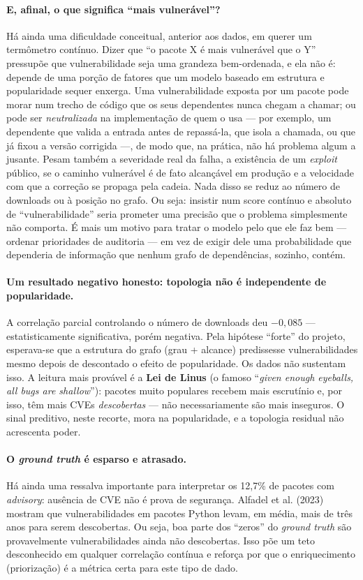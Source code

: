 \documentclass[11pt,a4paper]{article}
\begin{document}
\paragraph{E, afinal, o que significa ``mais vulnerável''?}
Há ainda uma dificuldade conceitual, anterior aos dados, em querer um termômetro
contínuo. Dizer que ``o pacote X é mais vulnerável que o Y'' pressupõe que
vulnerabilidade seja uma grandeza bem-ordenada, e ela não é: depende de uma porção de
fatores que um modelo baseado em estrutura e popularidade sequer enxerga. Uma
vulnerabilidade exposta por um pacote pode morar num trecho de código que os seus
dependentes nunca chegam a chamar; ou pode ser \emph{neutralizada} na implementação de
quem o usa --- por exemplo, um dependente que valida a entrada antes de repassá-la, que
isola a chamada, ou que já fixou a versão corrigida ---, de modo que, na prática, não
há problema algum a jusante. Pesam também a severidade real da falha, a existência de
um \emph{exploit} público, se o caminho vulnerável é de fato alcançável em produção e a
velocidade com que a correção se propaga pela cadeia. Nada disso se reduz ao número de
downloads ou à posição no grafo. Ou seja: insistir num score contínuo e absoluto de
``vulnerabilidade'' seria prometer uma precisão que o problema simplesmente não
comporta. É mais um motivo para tratar o modelo pelo que ele faz bem --- ordenar
prioridades de auditoria --- em vez de exigir dele uma probabilidade que dependeria de
informação que nenhum grafo de dependências, sozinho, contém.

\paragraph{Um resultado negativo honesto: topologia não é independente de
popularidade.}
A correlação parcial controlando o número de downloads deu $-0{,}085$ ---
estatisticamente significativa, porém negativa. Pela hipótese ``forte'' do projeto,
esperava-se que a estrutura do grafo (grau + alcance) predissesse vulnerabilidades
mesmo depois de descontado o efeito de popularidade. Os dados não sustentam isso.
A leitura mais provável é a \textbf{Lei de Linus} (o famoso ``\emph{given enough
eyeballs, all bugs are shallow}''): pacotes muito populares recebem mais escrutínio e,
por isso, têm mais CVEs \emph{descobertas} --- não necessariamente são mais
inseguros. O sinal preditivo, neste recorte, mora na popularidade, e a topologia
residual não acrescenta poder.

\paragraph{O \emph{ground truth} é esparso e atrasado.}
Há ainda uma ressalva importante para interpretar os 12,7\% de pacotes com
\emph{advisory}: ausência de CVE não é prova de segurança. Alfadel et al. (2023)
mostram que vulnerabilidades em pacotes Python levam, em média, mais de três anos para
serem descobertas. Ou seja, boa parte dos ``zeros'' do \emph{ground truth} são
provavelmente vulnerabilidades ainda não descobertas. Isso põe um teto desconhecido
em qualquer correlação contínua e reforça por que o enriquecimento (priorização) é a
métrica certa para este tipo de dado.
\end{document}
